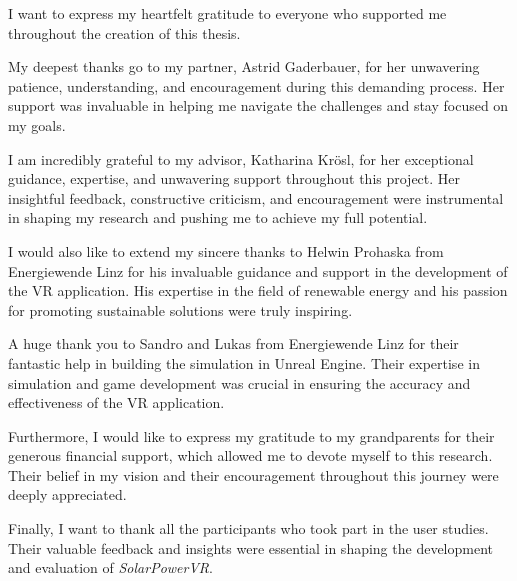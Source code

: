 \documentclass[draft, final]{vutinfth} %
\begin{document}
\frontmatter %

\addstatementpage

\begin{acknowledgements*}
I want to express my heartfelt gratitude to everyone who supported me throughout the creation of this thesis. 

My deepest thanks go to my partner, Astrid Gaderbauer, for her unwavering patience, understanding, and encouragement during this demanding process. Her support was invaluable in helping me navigate the challenges and stay focused on my goals.

I am incredibly grateful to my advisor, Katharina Krösl, for her exceptional guidance, expertise, and unwavering support throughout this project. Her insightful feedback, constructive criticism, and encouragement were instrumental in shaping my research and pushing me to achieve my full potential.

I would also like to extend my sincere thanks to Helwin Prohaska from Energiewende Linz for his invaluable guidance and support in the development of the VR application. His expertise in the field of renewable energy and his passion for promoting sustainable solutions were truly inspiring.

A huge thank you to Sandro and Lukas from Energiewende Linz for their fantastic help in building the simulation in Unreal Engine. Their expertise in simulation and game development was crucial in ensuring the accuracy and effectiveness of the VR application.

Furthermore, I would like to express my gratitude to my grandparents for their generous financial support, which allowed me to devote myself to this research. Their belief in my vision and their encouragement throughout this journey were deeply appreciated.

Finally, I want to thank all the participants who took part in the user studies. Their valuable feedback and insights were essential in shaping the development and evaluation of \textit{SolarPowerVR}.


\end{acknowledgements*}
\end{document}
